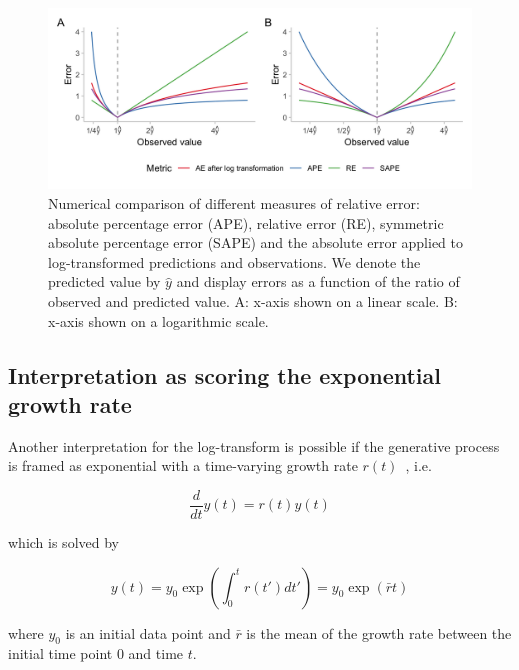 \documentclass{article}
\begin{document}
\begin{figure}[h!]
\centering
\includegraphics[width = 1\textwidth]{output/figures/different-relative-errors.png}
\caption{Numerical comparison of different measures of relative error: absolute percentage error (APE), relative error (RE), symmetric absolute percentage error (SAPE) and the absolute error applied to log-transformed predictions and observations. We denote the predicted value by $\hat{y}$ and display errors as a function of the ratio of observed and predicted value. A: x-axis shown on a linear scale. B: x-axis shown on a logarithmic scale.}
\label{fig:SAPE}
\end{figure}

\subsection{Interpretation as scoring the exponential growth rate}
\label{sec:methods:growthrate}

Another interpretation for the log-transform is possible if the generative process is framed as exponential with a time-varying growth rate $r(t)$~\citep[see, e.g.,][]{wallingaHowGenerationIntervals2007}, i.e.
\begin{linenomath*}
\begin{equation}
\frac{d}{dt}y(t) = r(t)y(t)
\end{equation}
\end{linenomath*}
%
which is solved by
%
\begin{linenomath*}
\begin{equation}
y(t) = y_0 \exp \left( \int_0^t r(t') dt' \right) = y_0 \exp (\bar{r}t)
\end{equation}
\end{linenomath*}
where $y_0$ is an initial data point and $\bar{r}$ is the mean of the growth rate between the initial time point $0$ and time $t$.
\end{document}
